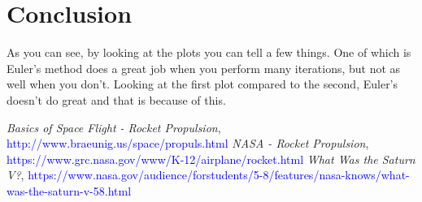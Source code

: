 \documentclass[11pt]{article}
\begin{document}
\section{Conclusion}
As you can see, by looking at the plots you can tell a few things. One of which is Euler's method does a great job when you perform many iterations, but not as well when you don't. Looking at the first plot compared to the second, Euler's doesn't do great and that is because of this.

\newpage
\begin{thebibliography}{9}

		\textit{Basics of Space Flight - Rocket Propulsion}, \textcolor{blue}{http://www.braeunig.us/space/propuls.html}
		\textit{NASA - Rocket Propulsion}, \textcolor{blue}{https://www.grc.nasa.gov/www/K-12/airplane/rocket.html}
   	 	\textit{What Was the Saturn V?}, \textcolor{blue}{https://www.nasa.gov/audience/forstudents/5-8/features/nasa-knows/what-was-the-saturn-v-58.html}

\end{thebibliography}
\end{document}
